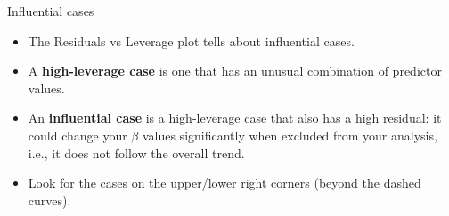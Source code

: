 \documentclass{beamer}\usepackage[]{graphicx}\usepackage[]{color}
\begin{document}
\begin{darkframes}
    
\begin{frame}[fragile]{Influential cases}  
      \begin{itemize}[<+->]
        \item The Residuals vs Leverage plot tells about \alert{influential cases}.
        \item A \textbf{high-leverage case} is one that has an unusual combination of predictor values. 
        \item An \textbf{influential case} is a high-leverage case that also has a high residual: it could change your $\beta$ values significantly when excluded from your analysis, i.e., it does not follow the overall trend. 
        \item Look for the cases on the upper/lower right corners (beyond the dashed curves).
      \end{itemize}
\end{frame}
    

  \end{darkframes}

  
\end{document}
